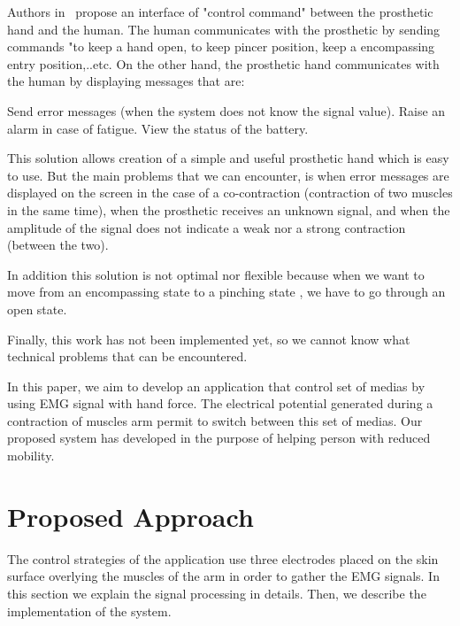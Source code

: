 \documentclass[conference]{IEEEtran}
\begin{document}
Authors in~\cite{Atieh} propose an interface of "control command" between the prosthetic hand and the human. The human communicates with the prosthetic by sending commands "to keep a hand open, to keep pincer position, keep a encompassing entry position,..etc. On the other hand, the prosthetic hand communicates with the human by displaying messages that are:\par
Send error messages (when the system does not know the signal value). Raise an alarm in case of fatigue. View the status of the battery.\par
This solution allows creation of a simple and useful prosthetic hand which is easy to use. But the main problems that we can encounter, is when error messages are displayed on the screen in the case of a co-contraction (contraction of two muscles in the same time), when the prosthetic receives an unknown signal, and when the amplitude of the signal does not indicate a weak nor a strong contraction (between the two).\par
In addition this solution is not optimal nor flexible because when we want to move from an encompassing state to a pinching state , we have to go through an open state.\par
Finally, this work has not been implemented yet, so we cannot know what technical problems that can be encountered. \par


In this paper, we aim to develop an application that control set of medias by using EMG signal with hand force. The electrical potential generated during a contraction of muscles arm permit to switch between this set of medias. Our proposed system has developed in the purpose of helping person with reduced mobility. \par
\section{Proposed Approach} \label{sec:proposedapproach}
The control strategies of the application use three electrodes placed on the skin surface overlying the
muscles of the arm in order to gather the EMG signals. In this section we explain the signal processing in details. Then, we describe the implementation of the system.
\end{document}
